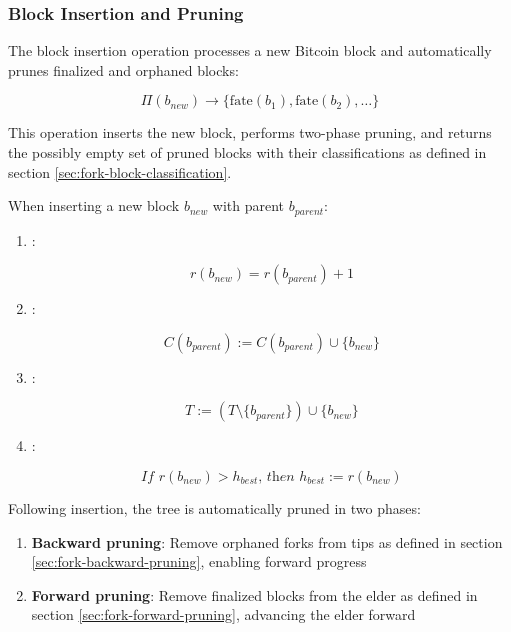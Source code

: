 \subsubsection{Block Insertion and Pruning}
\label{btc:insert-prune}

The block insertion operation processes a new Bitcoin block and automatically prunes finalized and orphaned blocks:

\begin{equation}
\Pi(b_{new}) \rightarrow \{\text{fate}(b_1), \text{fate}(b_2), \ldots\}
\end{equation}

This operation inserts the new block, performs two-phase pruning, and returns the possibly empty set of pruned blocks with their classifications as defined in section \ref{sec:fork-block-classification}.

When inserting a new block $b_{new}$ with parent $b_{parent}$:

\begin{enumerate}
    \item {}:
    
    \[r(b_{new}) = r(b_{parent}) + 1\]
    
    \item {}:
    
    \[C(b_{parent}) := C(b_{parent}) \cup \{b_{new}\}\]
    
    \item {}:

    \[T := (T \setminus \{b_{parent}\}) \cup \{b_{new}\}\]
    
    \item {}:
    
    \[\textit{If } r(b_{new}) > h_{best}\textit{, then } h_{best} := r(b_{new})\]
\end{enumerate}

Following insertion, the tree is automatically pruned in two phases:

\begin{enumerate}
    \item \textbf{Backward pruning}: Remove orphaned forks from tips as defined in section \ref{sec:fork-backward-pruning}, enabling forward progress
    \item \textbf{Forward pruning}: Remove finalized blocks from the elder as defined in section \ref{sec:fork-forward-pruning}, advancing the elder forward
\end{enumerate}

